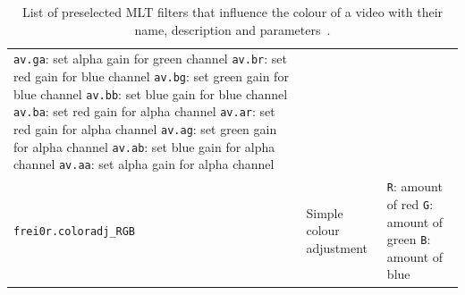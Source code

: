 \documentclass[../MasterThesis.tex]{subfiles}
\begin{document}
\begin{table}[H]
\begin{tabular}{lp{4.4cm}p{4.5cm}}
{		\texttt{av.ga}: set alpha gain for green channel \newline 
		\texttt{av.br}: set red gain for blue channel \newline 
		\texttt{av.bg}: set green gain for blue channel \newline 
		\texttt{av.bb}: set blue gain for blue channel \newline 
		\texttt{av.ba}: set red gain for alpha channel \newline 
		\texttt{av.ar}: set red gain for alpha channel \newline 
		\texttt{av.ag}: set green gain for alpha channel \newline 
		\texttt{av.ab}: set blue gain for alpha channel \newline 
		\texttt{av.aa}: set alpha gain for alpha channel}
		\\
		\texttt{frei0r.coloradj\_RGB} & Simple colour adjustment & 
		\tiny{
		\texttt{R}: amount of red \newline 
		\texttt{G}: amount of green \newline 
		\texttt{B}: amount of blue}
		\\
		\bottomrule
	\end{tabular}
	\caption[List of preselected MLT filters that influence the colour of a video.]{List of preselected MLT filters that influence the colour of a video with their name, description and parameters~\cite{melt_filters}.}
	\label{table:filter}
\end{table}






%
\end{document}
